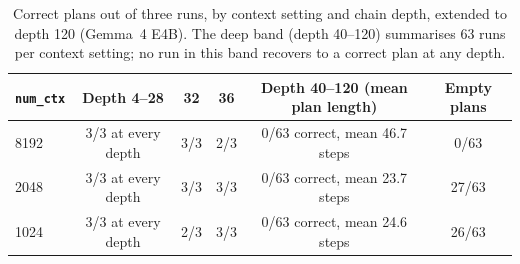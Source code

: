 
\begin{table}[htbp]
    \centering
    \caption{Correct plans out of three runs, by context setting and chain depth,
    extended to depth 120 (Gemma~4 E4B). The deep band (depth 40--120) summarises
    63 runs per context setting; no run in this band recovers to a correct plan at
    any depth.}
    \label{tab:ctx}
    \begin{tabular}{lccccc}
        \toprule
        \texttt{num\_ctx} & Depth 4--28 & 32 & 36 & Depth 40--120 (mean plan length) & Empty plans \\
        \midrule
        8192 & 3/3 at every depth & 3/3 & 2/3 & 0/63 correct, mean 46.7 steps & 0/63 \\
        2048 & 3/3 at every depth & 3/3 & 3/3 & 0/63 correct, mean 23.7 steps & 27/63 \\
        1024 & 3/3 at every depth & 2/3 & 3/3 & 0/63 correct, mean 24.6 steps & 26/63 \\
        \bottomrule
    \end{tabular}
\end{table}


